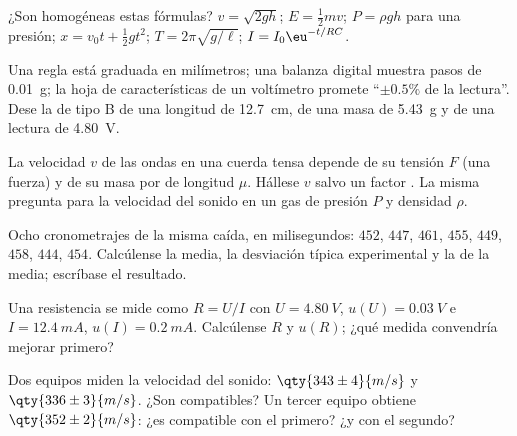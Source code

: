 \begin{exercise}[$\star$]\label{exo:b1:units-dimensions:3}
¿Son homogéneas estas fórmulas? $v = \sqrt{2gh}$;
$E = \tfrac12 m v$; $P = \rho g h$ para una presión; $x = v_0 t +
\tfrac12 g t^2$; $T = 2\pi\sqrt{g/\ell}$; $I = I_0 \eu^{-t/RC}$.
\end{exercise}

\begin{exercise}[$\star$]\label{exo:b1:units-dimensions:4}
Una regla está graduada en milímetros; una balanza digital muestra pasos
de \qty{0.01}{g}; la hoja de características de un voltímetro promete
``$\pm 0.5\%$ de la lectura''. Dese la  de tipo B de
una longitud de \qty{12.7}{cm}, de una masa de \qty{5.43}{g} y de una
lectura de \qty{4.80}{V}.
\end{exercise}

\begin{exercise}[$\star\star$]\label{exo:b1:units-dimensions:5}
La velocidad $v$ de las ondas en una cuerda tensa depende de su tensión
$F$ (una fuerza) y de su masa por  de longitud $\mu$. Hállese $v$
salvo un factor . La misma pregunta para la velocidad del
sonido en un gas de presión $P$ y densidad $\rho$.
\end{exercise}

\begin{exercise}[$\star\star$]\label{exo:b1:units-dimensions:6}
Ocho cronometrajes de la misma caída, en milisegundos: $452$, $447$,
$461$, $455$, $449$, $458$, $444$, $454$. Calcúlense la media, la
desviación típica experimental y la  de la media;
escríbase el resultado.
\end{exercise}

\begin{exercise}[$\star\star$]\label{exo:b1:units-dimensions:7}
Una resistencia se mide como $R = U/I$ con $U = \qty{4.80}{V}$,
$u(U) = \qty{0.03}{V}$ e $I = \qty{12.4}{mA}$, $u(I) = \qty{0.2}{mA}$.
Calcúlense $R$ y $u(R)$; ¿qué medida convendría mejorar primero?
\end{exercise}

\begin{exercise}[$\star\star$]\label{exo:b1:units-dimensions:8}
Dos equipos miden la velocidad del sonido: $\qty{343\pm4}{m/s}$ y
$\qty{336\pm3}{m/s}$. ¿Son compatibles? Un tercer equipo obtiene
$\qty{352\pm2}{m/s}$: ¿es compatible con el primero? ¿y con el segundo?
\end{exercise}

